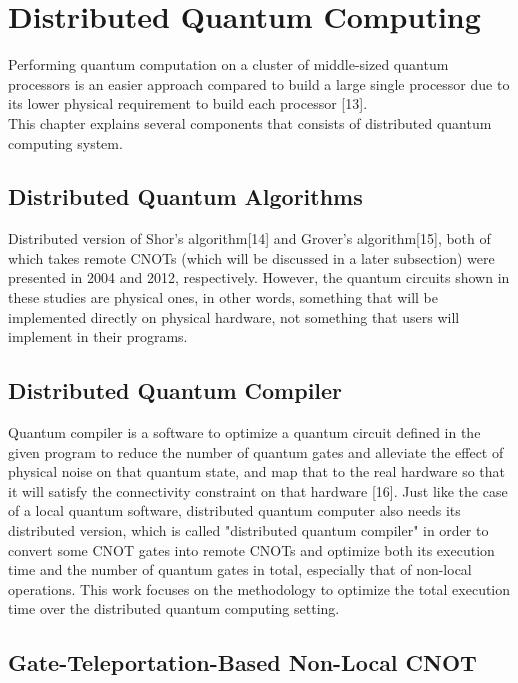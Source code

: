 \section{Distributed Quantum Computing}
 
  Performing quantum computation on a cluster of middle-sized quantum processors is an easier approach compared to build a large single processor due to its lower physical requirement to build each processor [13].  \\
This chapter explains several components that consists of distributed quantum computing system.

\subsection{Distributed Quantum Algorithms}

Distributed version of Shor's algorithm[14] and Grover's algorithm[15], both of which takes remote CNOTs (which will be discussed in a  later subsection) were presented in 2004 and 2012, respectively. 
However, the quantum circuits shown in these studies are physical ones, in other words, something that will be implemented directly on physical hardware, not something that users will implement in their programs. 

\subsection{Distributed Quantum Compiler}

 Quantum compiler is a software to optimize a quantum circuit defined in the given program to reduce the number of quantum gates and alleviate the effect of physical noise on that quantum state, and map that to the real hardware so that it will satisfy the connectivity constraint on that hardware [16].  Just like the case of a local quantum software, distributed quantum computer also needs its distributed version, which is called "distributed quantum compiler" in order to convert some CNOT gates into remote CNOTs and optimize both its execution time and the number of quantum gates in total, especially that of non-local operations.  This work focuses on the methodology to optimize the total execution time over the distributed quantum computing setting.
 
 \subsection{Gate-Teleportation-Based Non-Local CNOT}
 
